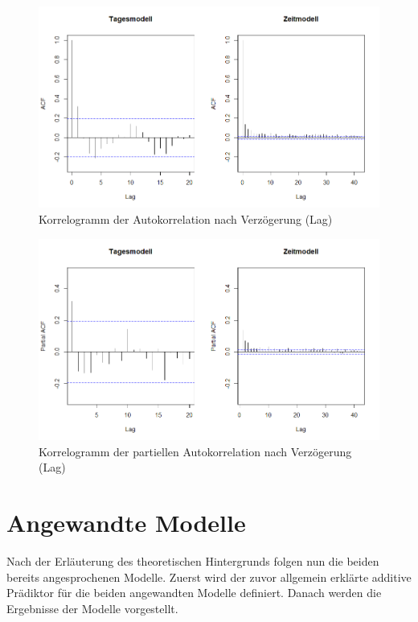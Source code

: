 \documentclass[12pt]{scrreprt}
\begin{document}
\begin{figure}[H]
	\centering
	\includegraphics[width=\linewidth]{plots/ACF}
	\caption{Korrelogramm der Autokorrelation nach Verzögerung (Lag)}
	\label{pic:ACF}	
\end{figure}

\begin{figure}[H]
	\centering
	\vspace{-0.85cm}
	\includegraphics[width=\linewidth]{plots/PACF}
	\caption{Korrelogramm der partiellen Autokorrelation nach Verzögerung (Lag)}
	\label{pic:PACF}	
\end{figure}


\chapter{Angewandte Modelle}
\vspace{-0.5cm}
Nach der Erläuterung des theoretischen Hintergrunds folgen nun die beiden bereits angesprochenen Modelle. Zuerst wird der zuvor allgemein erklärte additive Prädiktor für die beiden angewandten Modelle definiert. Danach werden die Ergebnisse der Modelle vorgestellt.
\end{document}

